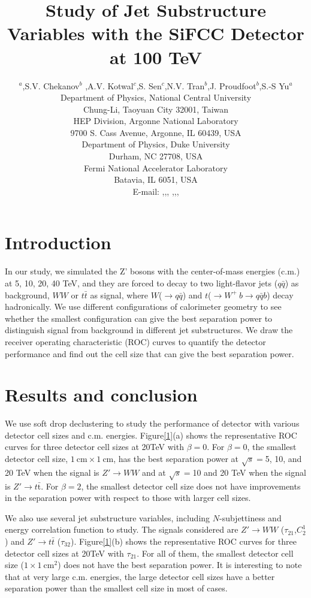 \documentclass[a4paper]{PoS}
\title{Study of Jet Substructure Variables with the SiFCC Detector at 100 TeV}
\author{\speaker{Chih-Hsiang Yeh}$^a$,S.V. Chekanov$^b$ ,A.V. Kotwal$^{c}$,S. Sen$^{c}$,N.V. Tran$^{b}$,J. Proudfoot$^{b}$,S.-S Yu$^{a}$\\     
     \llap{$^a$}Department of Physics, National Central University\\
     Chung-Li, Taoyuan City 32001, Taiwan\\
     \llap{$^b$}HEP Division, Argonne National Laboratory\\
     9700 S. Cass Avenue, Argonne, IL 60439, USA\\
     \llap{$^c$}Department of Physics, Duke University\\
     Durham, NC 27708, USA\\
     \llap{$^d$}Fermi National Accelerator Laboratory\\
     Batavia, IL 6051, USA\\
     E-mail:  \email{a9510130375@gmail.com},\email{chekanov@anl.gov},\email{kotwal@phy.duke.edu},
     \email{sourav.sen@duke.edu},\email{ntran@fnal.gov},\email{proudfoot@anl.gov},\email{syu@phy.ncu.edu.tw}}
\begin{document}
\section{Introduction}
In our study, we simulated the Z' bosons with the center-of-mass energies (c.m.) at 5, 10, 20, 40 TeV, and they are forced to decay to two light-flavor jets ($q\bar{q}$) as background, $W W$ or $t\bar{t}$ as signal, where $W$($\rightarrow$$q\bar{q}$) and $t$($ \rightarrow  W^+\>b \rightarrow q\bar{q} b$) decay hadronically. We use different configurations of calorimeter geometry to see whether the smallest configuration can give the best separation power to distinguish signal from background in different jet substructures. We draw the receiver operating characteristic (ROC) curves to quantify the detector performance and find out the cell size that can give the best separation power.

\section{Results and conclusion}
We use soft drop declustering\cite{Larkoski:2014wba} to study the performance of detector with various detector cell sizes and c.m. energies. Figure\ref{1}(a) shows the representative ROC curves for three detector cell sizes at 20TeV with $\beta=0$. For $\beta=0$, the smallest detector cell size, $1~\mathrm{cm}\times1~\mathrm{cm}$, has the best separation power at $\sqrt{s}=$5, 10, and 20 TeV when the signal is $Z' \rightarrow WW$ and at $\sqrt{s}=$10 and 20 TeV when the signal is $Z' \rightarrow t\bar{\mathrm{t}}$. For $\beta=2$, the smallest detector cell size does not have improvements in the separation power with respect to those with larger cell sizes.

We also use several jet substructure variables, including $N$-subjettiness\cite{Thaler:2010tr} and energy correlation function\cite{Larkoski:2013eya} to study. The signals considered are $Z'\rightarrow WW$ ($\tau_{21}$,$C_2^1$) and $Z' \rightarrow t\bar{t}$ ($\tau_{32}$). Figure\ref{1}(b) shows the representative ROC curves for three detector cell sizes at 20TeV with $\tau_{21}$. For all of them, the smallest detector cell size ($1\times1~\mathrm{cm}^2$) does not have the best separation power. It is interesting to note that at very large c.m. energies, the large detector cell sizes have a better separation power than the smallest cell size in most of cases. 
\end{document}
